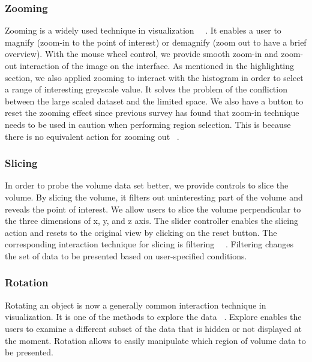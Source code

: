 \documentclass[annual]{acmsiggraph}
\begin{document}
\subsubsection{Zooming}
Zooming is a widely used technique in visualization ~\cite{shneiderman:1996}~\cite{cockburn:2008}. It enables a user to magnify (zoom-in to the point of interest) or demagnify (zoom out to have a brief overview). With the mouse wheel control, we provide smooth zoom-in and zoom-out interaction of the image on the interface. As mentioned in the highlighting section, we also applied zooming to interact with the histogram in order to select a range of interesting greyscale value. It solves the problem of the confliction between the large scaled dataset and the limited space. We also have a button to reset the zooming effect since previous survey has found that zoom-in technique needs to be used in caution when performing region selection. This is because there is no equivalent action for zooming out ~\cite{cockburn:2008}.

\subsubsection{Slicing}
In order to probe the volume data set better, we provide controls to slice the volume. By slicing the volume, it filters out uninteresting part of the volume and reveals the point of interest. We allow users to slice the volume perpendicular to the three dimensions of x, y, and z axis. The slider controller enables the slicing action and resets to the original view by clicking on the reset button. The corresponding interaction technique for slicing is filtering ~\cite{shneiderman:1996}~\cite{yi:2007}. Filtering changes the set of data to be presented based on user-specified conditions. 

\subsubsection{Rotation}
Rotating an object is now a generally common interaction technique in visualization. It is one of the methods to explore the data ~\cite{yi:2007}. Explore enables the users to examine a different subset of the data that is hidden or not displayed at the moment. Rotation allows to easily manipulate which region of volume data to be presented.
\end{document}
